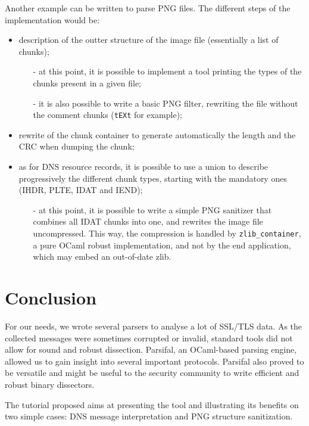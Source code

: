 \documentclass{article}
\begin{document}
Another example can be written to parse PNG files. The different steps
of the implementation would be:
\begin{itemize}
\item description of the outter structure of the image file
  (essentially a list of chunks);
\begin{itemize}
\item[-] at this point, it is possible to implement a tool printing
  the types of the chunks present in a given file;
\item[-] it is also possible to write a basic PNG filter, rewriting
  the file without the comment chunks (\texttt{tEXt} for example);
\end{itemize}
\item rewrite of the chunk container to generate automatically the
  length and the CRC when dumping the chunk;
\item as for DNS resource records, it is possible to use a union to
  describe progressively the different chunk types, starting with the
  mandatory ones (IHDR, PLTE, IDAT and IEND);
\begin{itemize}
\item[-] at this point, it is possible to write a simple PNG sanitizer
  that combines all IDAT chunks into one, and rewrites the image file
  uncompressed. This way, the compression is handled by
  \texttt{zlib\_container}, a pure OCaml robust implementation, and
  not by the end application, which may embed an out-of-date zlib.
\end{itemize}
\end{itemize}



\section{Conclusion}

For our needs, we wrote several parsers to analyse a lot of SSL/TLS
data. As the collected messages were sometimes corrupted or invalid,
standard tools did not allow for sound and robust
dissection. Parsifal, an OCaml-based parsing engine, allowed us to
gain insight into several important protocols. Parsifal also proved to
be versatile and might be useful to the security community to write
efficient and robust binary dissectors.

The tutorial proposed aims at presenting the tool and illustrating its
benefits on two simple cases: DNS message interpretation and PNG
structure sanitization.




\end{document}
